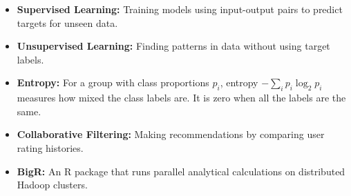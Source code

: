 \documentclass[12pt,a4paper]{article}
\begin{document}
\begin{tcolorbox}[defbox, title={\textbf{One-Line Definitions}}]
\begin{itemize}[leftmargin=*, itemsep=3pt, topsep=0pt]
  \item \textbf{Supervised Learning:} Training models using input-output pairs to predict targets for unseen data.
  \item \textbf{Unsupervised Learning:} Finding patterns in data without using target labels.
  \item \textbf{Entropy:} For a group with class proportions $p_i$, entropy $-\sum_i p_i\log_2 p_i$ measures how mixed the class labels are. It is zero when all the labels are the same.
  \item \textbf{Collaborative Filtering:} Making recommendations by comparing user rating histories.
  \item \textbf{BigR:} An R package that runs parallel analytical calculations on distributed Hadoop clusters.
\end{itemize}
\end{tcolorbox}

\vspace{6pt}
\end{document}

